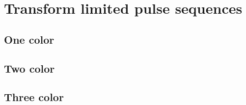 \label{computer chapter}

\section{Transform limited pulse sequences}
\subsection{One color}


\subsection{Two color}



\subsection{Three color}



